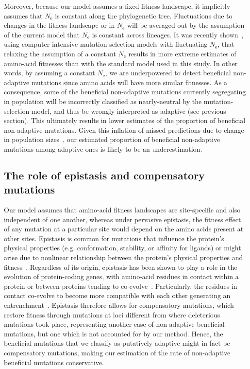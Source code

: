 \documentclass{article}
\newcommand{\Ne}{N_{\text{e}}}
\begin{document}
    Moreover, because our model assumes a fixed fitness landscape, it implicitly assumes that $\Ne$ is constant along the phylogenetic tree.
    Fluctuations due to changes in the fitness landscape or in $\Ne$ will be averaged out by the assumption of the current model that $\Ne$ is constant across lineages.
    It was recently shown~\cite{latrille_inferring_2021}, using computer intensive mutation-selection models with fluctuating $\Ne$, that relaxing the assumption of a constant $\Ne$ results in more extreme estimates of amino-acid fitnesses than with the standard model used in this study.
    In other words, by assuming a constant $\Ne$, we are underpowered to detect beneficial non-adaptive mutations since amino acids will have more similar fitnesses.
    As a consequence, some of the beneficial non-adaptive mutations currently segregating in population will be incorrectly classified as nearly-neutral by the mutation-selection model, and thus be wrongly interpreted as adaptive (see previous section).
    This ultimately results in lower estimates of the proportion of beneficial non-adaptive mutations.
    Given this inflation of missed predictions due to change in population sizes~\cite{lanfear_population_2014, jones_shifting_2017, platt_protein_2018}, our estimated proportion of beneficial non-adaptive mutations among adaptive ones is likely to be an underestimation.

    \subsection*{The role of epistasis and compensatory mutations}

    Our model assumes that amino-acid fitness landscapes are site-specific and also independent of one another, whereas under pervasive epistasis, the fitness effect of any mutation at a particular site would depend on the amino acids present at other sites.
    Epistasis is common for mutations that influence the protein’s physical properties (e.g. conformation, stability, or affinity for ligands) or might arise due to nonlinear relationship between the protein’s physical properties and fitness~\cite{starr_epistasis_2016}.
    Regardless of its origin, epistasis has been shown to play a role in the evolution of protein-coding genes, with amino-acid residues in contact within a protein or between proteins tending to co-evolve~\cite{morcos_directcoupling_2011, marks_protein_2012, starr_epistasis_2016}.
    Particularly, the residues in contact co-evolve to become more compatible with each other generating an entrenchment~\cite{goldstein_nonadaptive_2015, goldstein_sequence_2017, park_epistatic_2022}.
    Epistasis therefore allows for compensatory mutations, which restore fitness through mutations at loci different from where deleterious mutations took place, representing another case of non-adaptive beneficial mutations, but one which is not accounted for by our method.
    Hence, the beneficial mutations that we classify as putatively adaptive might in fact be compensatory mutations, making our estimation of the rate of non-adaptive beneficial mutations conservative.
\end{document}
